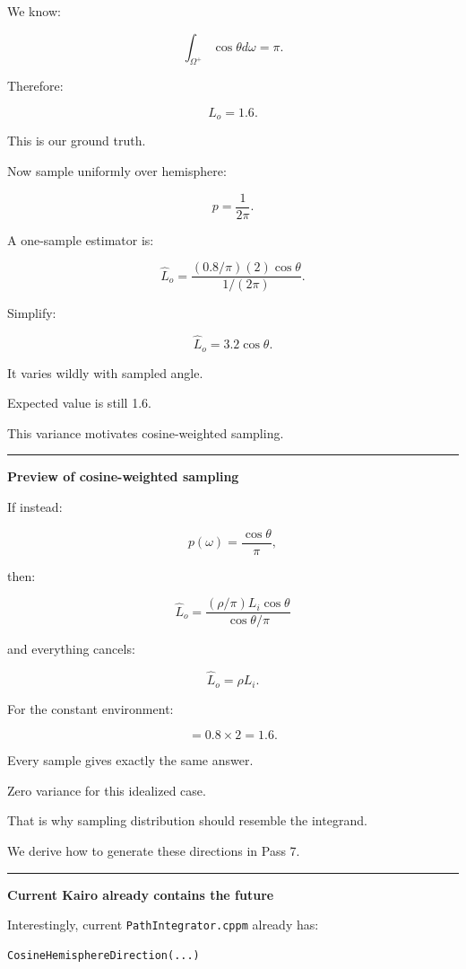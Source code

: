 We know:

\[
\int_{\Omega^+}
\cos\theta d\omega
=
\pi.
\]

Therefore:

\[
\boxed{
L_o=1.6.
}
\]

This is our ground truth.

Now sample uniformly over hemisphere:

\[
p=\frac1{2\pi}.
\]

A one-sample estimator is:

\[
\hat L_o
=
\frac{
(0.8/\pi)(2)\cos\theta
}{
1/(2\pi)
}.
\]

Simplify:

\[
\boxed{
\hat L_o
=
3.2\cos\theta.
}
\]

It varies wildly with sampled angle.

Expected value is still 1.6.

This variance motivates cosine-weighted sampling.

\begin{center}\rule{0.5\linewidth}{0.5pt}\end{center}

\textbf{Preview of cosine-weighted sampling}

If instead:

\[
p(\omega)
=
\frac{\cos\theta}{\pi},
\]

then:

\[
\hat L_o
=
\frac{
(\rho/\pi)L_i\cos\theta
}{
\cos\theta/\pi
}
\]

and everything cancels:

\[
\boxed{
\hat L_o
=
\rho L_i.
}
\]

For the constant environment:

\[
=
0.8\times2
=
1.6.
\]

Every sample gives exactly the same answer.

Zero variance for this idealized case.

That is why sampling distribution should resemble the integrand.

We derive how to generate these directions in Pass 7.

\begin{center}\rule{0.5\linewidth}{0.5pt}\end{center}

\textbf{Current Kairo already contains the future}

Interestingly, current \texttt{PathIntegrator.cppm} already has:

\begin{verbatim}
CosineHemisphereDirection(...)
\end{verbatim}

